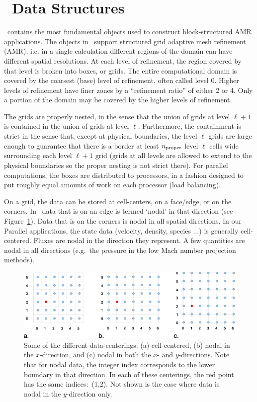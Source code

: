 \section{\BoxLib\ Data Structures}

\BoxLib\ contains the most fundamental objects used to construct block-structured
AMR applications.  The objects in \BoxLib\ support structured
grid adaptive mesh refinement (AMR), i.e. in a single calculation
different regions of the domain can have different spatial resolutions.  
At each level of refinement, the region covered by that level is broken
into boxes, or grids.  The entire computational domain is covered by
the coarsest (base) level of refinement, often called level 0. 
Higher levels of refinement have finer zones by a ``refinement ratio''
of either 2 or 4.  Only a portion of the domain may
be covered by the higher levels of refinement.  

The grids are properly nested, in the sense that the union of grids
at level $\ell+1$ is contained in the union of grids at level $\ell$.
Furthermore, the containment is strict in the sense that,
except at physical boundaries,
the level $\ell$ grids are large enough to guarantee that there is
a border at least $n_{\rm proper}$ level $\ell$ cells wide surrounding each level
$\ell +1$ grid (grids at all levels are allowed to extend to the physical
boundaries so the proper nesting is not strict there).
For parallel computations, the boxes are distributed to processors, in
a fashion designed to put roughly equal amounts of work on each
processor (load balancing).

On a grid, the data can be stored at cell-centers, on a face/edge, or
on the corners.  In \BoxLib\, data that is on an edge is termed `nodal'
in that direction (see Figure~\ref{fig:dataloc}).  Data that is on the
corners is nodal in all spatial directions.  In our Parallel applications, 
the state data (velocity, density, species $\ldots$) is generally
cell-centered.  Fluxes are nodal in the direction they represent.
A few quantities are nodal in all directions (e.g.\ the pressure in
the low Mach number projection methods).

\begin{figure}[h]
\centering
\includegraphics[width=6.5in]{./BoxLib/data_loc2}
\caption{\label{fig:dataloc} Some of the different data-centerings:
(a) cell-centered, (b) nodal in the $x$-direction, and (c) nodal in
both the $x$- and $y$-directions.  Note that for nodal data, the
integer index corresponds to the lower boundary in that direction.
In each of these centerings, the red point has the same indices:\ (1,2).
Not shown is the case where data is nodal in the $y$-direction only.}
\end{figure}

